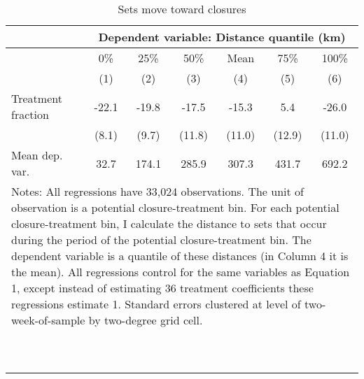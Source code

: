 \begin{table}[tb]
\centering
\caption{Sets move toward closures} 
\label{change_distance_closure}
\begin{tabular}{lcccccc}
   \toprule & \multicolumn{6}{c}{Dependent variable: Distance quantile (km)}  \\  \midrule  & 0\% & 25\% & 50\% & Mean & 75\% & 100\% \\ 
   & (1) & (2) & (3) & (4) & (5) & (6) \\ 
   \midrule Treatment fraction & -22.1 & -19.8 & -17.5 & -15.3 & 5.4 & -26.0 \\ 
   & (8.1) & (9.7) & (11.8) & (11.0) & (12.9) & (11.0) \\ 
   \midrule Mean dep. var. & 32.7 & 174.1 & 285.9 & 307.3 & 431.7 & 692.2 \\ 
   \bottomrule \multicolumn{7}{l}{\multirow{2}{12cm}{Notes: All regressions have 33,024 observations. The unit of observation is a potential closure-treatment bin. For each potential closure-treatment bin, I calculate the distance to sets that occur during the period of the potential closure-treatment bin. The dependent variable is a quantile of these distances (in Column 4 it is the mean). All regressions control for the same variables as Equation 1, except instead of estimating 36 treatment coefficients these regressions estimate 1. Standard errors clustered at level of two-week-of-sample by two-degree grid cell.}} \\\\\\\\\\\\\\\\\\\\\\\\ \end{tabular}
\end{table}
